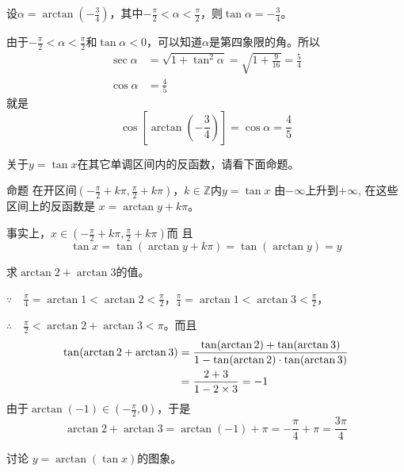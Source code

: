 \begin{solution}
设$\alpha=\arctan\left(-\frac{3}{4}\right)$，其中$-\frac{\pi}{2}<\alpha<\frac{\pi}{2}$，则$\tan\alpha=-\frac{3}{4}$。

由于$-\frac{\pi}{2}<\alpha<\frac{\pi}{2}$和$\tan\alpha<0$，可以知道$\alpha$是第四象限的角。所以
\[\begin{split}
    \sec\alpha&=\sqrt{1+\tan^2\alpha}=\sqrt{1+\frac{9}{16}}=\frac{5}{4}\\
    \cos\alpha&=\frac{4}{5}
\end{split}\]
就是
\[\cos\left[\arctan\left(-\frac{3}{4}\right)\right]=\cos\alpha=\frac{4}{5}\]
\end{solution}

关于$y=\tan x$在其它单调区间内的反函数，请看下面命题。

\begin{blk}{命题}
    在开区间$\left(-\frac{\pi}{2}+k\pi ,\frac{\pi}{2}+k\pi 
\right)$，$k\in\mathbb{Z}$内$y=\tan x$
由$-\infty$上升到$+\infty$, 在这些区间上的反函数是
$x=\arctan y+k\pi$。
\end{blk}

事实上，$x\in \left(-\frac{\pi}{2}+k\pi ,\frac{\pi}{2}+k\pi 
\right)$而
且
\[\tan x=\tan (\arctan y+k\pi )=\tan (\arctan y)=y\]




\begin{example}
    求$\arctan 2+\arctan 3$的值。
\end{example}

\begin{solution}
    $\because\quad \frac{\pi}{4}=\arctan 1<\arctan 2<\frac{\pi}{2}$，$\frac{\pi}{4}=\arctan 1<\arctan 3<\frac{\pi}{2}$，

    $\therefore\quad \frac{\pi}{2}<\arctan 2+\arctan 3<\pi$。而且
\[\begin{split}
    \tan(\arctan 2+\arctan 3)&=\dfrac{\tan (\arctan 2)+\tan (\arctan  3)}{1-\tan(\arctan 2)\cdot \tan (\arctan 3)}\\
    &=\dfrac{2+3}{1-2\times 3}=-1
\end{split}\]
由于$\arctan (-1)\in \left(-\frac{\pi}{2},0\right)$，于是
\[\arctan 2+\arctan 3=\arctan (-1)+\pi=-\frac{\pi}{4}+\pi=\frac{3\pi}{4}\]
\end{solution}

\begin{example}
    讨论 $y=\arctan (\tan x)$的图象。
\end{example}

